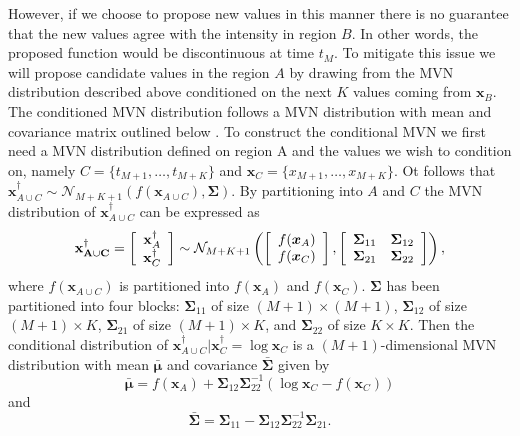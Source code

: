 \documentclass[oneside, 12 pt]{book}
\begin{document}
 
 However, if we choose to propose new values in this manner there is no guarantee that the new values agree with the intensity in region $B$. In other words, the proposed function would be discontinuous at time $t_M$. To mitigate this issue we will propose candidate values in the region $A$ by drawing from the MVN distribution described above conditioned on the next $K$ values coming from $\mathbf{x}_B$.  The conditioned MVN distribution follows a MVN distribution with mean and covariance matrix outlined below \cite{}. 
 To construct the conditional MVN we first need a MVN distribution defined on region A and the values we wish to condition on, namely $C = \{t_{M+1}, \dots, t_{M+K}\}$ and $ \mathbf{x}_C = \{x_{M+1}, \dots, x_{M+K}\}$. Ot follows that $\mathbf{x}_{A \cup C}^\dag \sim \mathcal{N}_{M+K+1}(f(\mathbf{x}_{A\cup C}),\boldsymbol \Sigma)$.  
 By partitioning into $A$ and $C$ the MVN distribution of $\mathbf{x}^\dag_{A\cup C}$ can be expressed as 
\begin{equation*}
	\mathbf{x_{A\cup C}^\dag} = \left[
	\begin{array}{c}
		\mathbf{x}_{A}^\dag \\
		\mathbf{x}_{C}^\dag
	\end{array} \right] \sim \mathcal{N}_{M+K+1} \left(	\left[
	\begin{array}{c}
		f(\boldsymbol{x}_{A}) \\
		f(\boldsymbol{x}_{C})
	\end{array} \right] , \left[ \begin{array}{c c}
		\boldsymbol \Sigma_{11} & \boldsymbol \Sigma_{12} \\
		\boldsymbol \Sigma_{21} & \boldsymbol \Sigma_{22} 
	\end{array} \right] \right),
\end{equation*}
where $f(\mathbf{x}_{A\cup C})$ is partitioned into $f(\mathbf{x}_{A})$ and  $f(\mathbf{x}_{C})$. $\boldsymbol{\Sigma}$ has been partitioned into four blocks: $\boldsymbol{\Sigma}_{11}$ of size $(M+1) \times (M+1)$, $\boldsymbol{\Sigma}_{12}$ of size $(M+1) \times K$, $\boldsymbol{\Sigma}_{21}$ of size $(M+1) \times K$, and $\boldsymbol{\Sigma}_{22}$ of size $K \times K$.   Then the conditional distribution of $\mathbf{x}^\dag_{A\cup C} | \mathbf{x}^\dag_{C} = \log \mathbf{x}_{C}$ is a $(M+1)$-dimensional MVN distribution with mean $\boldsymbol{\bar \mu}$ and covariance $\boldsymbol{\bar \Sigma}$ given by \begin{equation}\label{eq:mu}
	\boldsymbol{\bar \mu} = f(\boldsymbol{x}_{A}) + \boldsymbol \Sigma_{12} \boldsymbol \Sigma_{22}^{-1} \left( \log \mathbf{x}_{C} -f \left( \boldsymbol{x}_{C} \right) \right)
\end{equation}
and
\begin{equation*}
	\boldsymbol{\bar \Sigma} = \boldsymbol \Sigma_{11} - \boldsymbol \Sigma_{12} \boldsymbol  \Sigma_{22}^{-1}\boldsymbol  \Sigma_{21}.
\end{equation*} 
\end{document}

